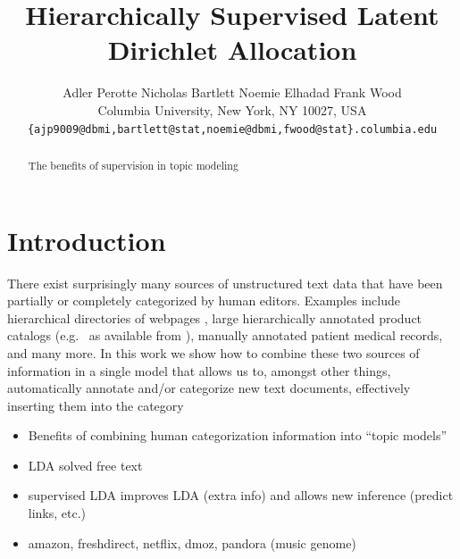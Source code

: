 \documentclass{article}
\title{Hierarchically Supervised Latent Dirichlet Allocation}
\author{
Adler Perotte\hspace{1cm} Nicholas Bartlett \hspace{1cm} Noemie Elhadad \hspace{1cm} Frank Wood\\
Columbia University, New York, NY 10027, USA \\
\texttt{\{ajp9009@dbmi,bartlett@stat,noemie@dbmi,fwood@stat\}.columbia.edu}
}
\begin{document}
\maketitle

\begin{abstract}
The benefits of supervision in topic modeling 
\end{abstract}

\section{Introduction}

\label{sec:introduction}

There exist surprisingly many sources of unstructured text data that have been partially or completely categorized by human editors.  Examples include hierarchical directories of webpages \citep{DMOZ}, large hierarchically annotated product catalogs (e.g.~\citep{AMAZON} as available from \citep{SNAP}), manually annotated patient medical records, and many more.  In this work we show how to combine these two sources of information in a single model that allows us to, amongst other things, automatically annotate and/or categorize new text documents, effectively inserting them into the category

\begin{itemize}
\item Benefits of combining human categorization information into ``topic models''
\item LDA solved free text
\item supervised LDA improves LDA (extra info) and allows new inference (predict links, etc.)
\item amazon, freshdirect, netflix, dmoz, pandora (music genome)
\end{itemize}


%
\end{document}
